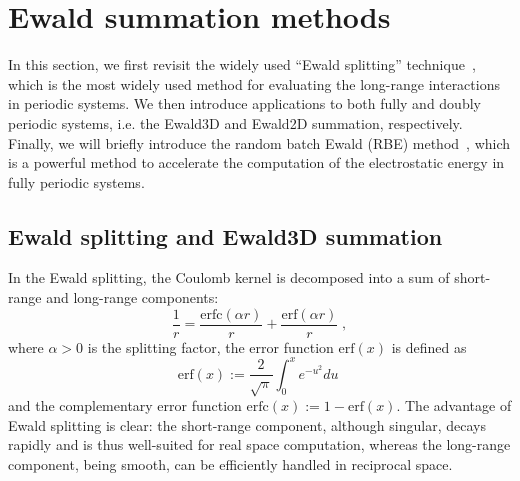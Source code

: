 \section{Ewald summation methods}

In this section, we first revisit the widely used ``Ewald splitting'' technique~\cite{Ewald1921AnnPhys}, which is the most widely used method for evaluating the long-range interactions in periodic systems.
We then introduce  applications to both fully and doubly periodic systems, i.e. the Ewald3D and Ewald2D summation, respectively.
Finally, we will briefly introduce the random batch Ewald (RBE) method~\cite{jin2021random}, which is a powerful method to accelerate the computation of the electrostatic energy in fully periodic systems.

\subsection{Ewald splitting and Ewald3D summation} \label{sec::ewald_splitting}

In the Ewald splitting, the Coulomb kernel is decomposed into a sum of short-range and long-range components:
\begin{equation}\label{eq:ewald_decomposition}
\frac{1}{r}=\frac{\mathrm{erfc}(\alpha r)}{r}+\frac{\mathrm{erf}(\alpha r)}{r} \;,
\end{equation}
where $\alpha>0$ is the splitting factor, the error function $\mathrm{erf}(x)$ is  defined as
\begin{equation}\label{eq:erf}
    \mathrm{erf}(x):=\frac{2}{\sqrt{\pi}}\int_0^x e^{-u^2}du\;
\end{equation}
and the complementary error function $\mathrm{erfc}(x):=1-\mathrm{erf}(x)$. 
The advantage of Ewald splitting is clear:
the short-range component, although singular, decays rapidly and is thus well-suited for real space computation, whereas the long-range component, being smooth, can be efficiently handled in reciprocal space.


